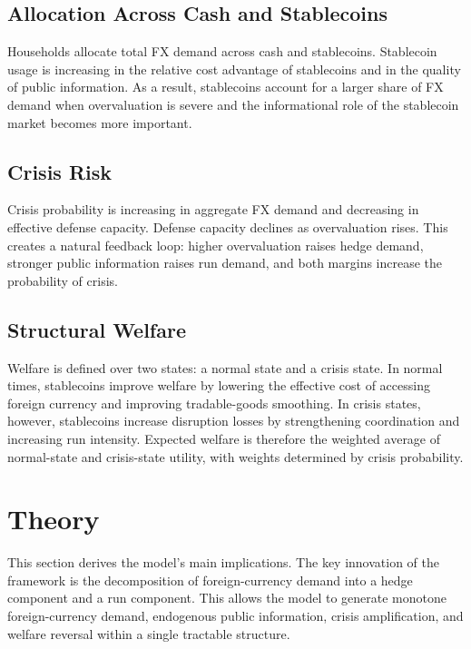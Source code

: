 \documentclass[12pt]{article}
\begin{document}
\subsection{Allocation Across Cash and Stablecoins}

Households allocate total FX demand across cash and stablecoins. Stablecoin usage is increasing in the relative cost advantage of stablecoins and in the quality of public information. As a result, stablecoins account for a larger share of FX demand when overvaluation is severe and the informational role of the stablecoin market becomes more important.

\subsection{Crisis Risk}

Crisis probability is increasing in aggregate FX demand and decreasing in effective defense capacity. Defense capacity declines as overvaluation rises. This creates a natural feedback loop: higher overvaluation raises hedge demand, stronger public information raises run demand, and both margins increase the probability of crisis.

\subsection{Structural Welfare}

Welfare is defined over two states: a normal state and a crisis state. In normal times, stablecoins improve welfare by lowering the effective cost of accessing foreign currency and improving tradable-goods smoothing. In crisis states, however, stablecoins increase disruption losses by strengthening coordination and increasing run intensity. Expected welfare is therefore the weighted average of normal-state and crisis-state utility, with weights determined by crisis probability.

\section{Theory}

This section derives the model's main implications. The key innovation of the framework is the decomposition of foreign-currency demand into a hedge component and a run component. This allows the model to generate monotone foreign-currency demand, endogenous public information, crisis amplification, and welfare reversal within a single tractable structure.
\end{document}

